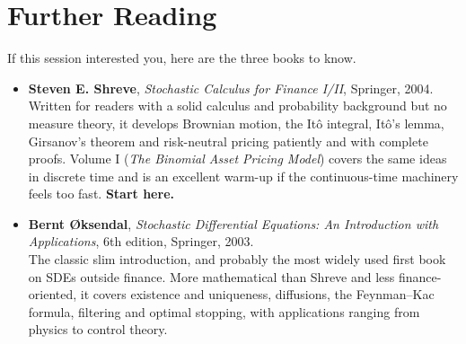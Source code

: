 \documentclass[]{article}
\newcommand{\Ito}{It\^{o}}
\begin{document}
	\section{Further Reading}

	If this session interested you, here are the three books to know.

	\begin{itemize}
		\item \textbf{Steven E. Shreve}, \textit{Stochastic Calculus for Finance I/II}, Springer, 2004.\\
		Written for readers with a solid calculus and probability background but no measure theory, it develops Brownian motion, the \Ito{} integral, \Ito's lemma, Girsanov's theorem and risk-neutral pricing patiently and with complete proofs.
		Volume I (\textit{The Binomial Asset Pricing Model}) covers the same ideas in discrete time and is an excellent warm-up if the continuous-time machinery feels too fast.
		\textbf{Start here.}

		\item \textbf{Bernt {\O}ksendal}, \textit{Stochastic Differential Equations: An Introduction with Applications}, 6th edition, Springer, 2003.\\
		The classic slim introduction, and probably the most widely used first book on SDEs outside finance.
		More mathematical than Shreve and less finance-oriented, it covers existence and uniqueness, diffusions, the Feynman--Kac formula, filtering and optimal stopping, with applications ranging from physics to control theory.

	\end{itemize}
\end{document}
